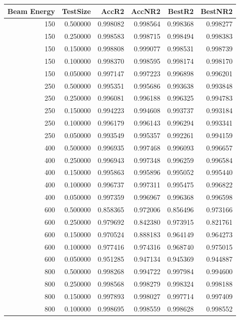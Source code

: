 \begin{tabular}{rrrrrr}
\toprule
Beam Energy & TestSize & AccR2 & AccNR2 & BestR2 & BestNR2 \\
\midrule
150 & 0.500000 & 0.998082 & 0.998564 & 0.998368 & 0.998277 \\
150 & 0.250000 & 0.998583 & 0.998715 & 0.998494 & 0.998383 \\
150 & 0.150000 & 0.998808 & 0.999077 & 0.998531 & 0.998739 \\
150 & 0.100000 & 0.998370 & 0.998595 & 0.998174 & 0.998170 \\
150 & 0.050000 & 0.997147 & 0.997223 & 0.996898 & 0.996201 \\
250 & 0.500000 & 0.995351 & 0.995686 & 0.993638 & 0.993848 \\
250 & 0.250000 & 0.996081 & 0.996188 & 0.996325 & 0.994783 \\
250 & 0.150000 & 0.994223 & 0.994608 & 0.993737 & 0.993184 \\
250 & 0.100000 & 0.996179 & 0.996143 & 0.996294 & 0.993341 \\
250 & 0.050000 & 0.993549 & 0.995357 & 0.992261 & 0.994159 \\
400 & 0.500000 & 0.996935 & 0.997468 & 0.996093 & 0.996657 \\
400 & 0.250000 & 0.996943 & 0.997348 & 0.996259 & 0.996584 \\
400 & 0.150000 & 0.995863 & 0.995896 & 0.995052 & 0.995440 \\
400 & 0.100000 & 0.996737 & 0.997311 & 0.995475 & 0.996822 \\
400 & 0.050000 & 0.997359 & 0.996967 & 0.996368 & 0.996598 \\
600 & 0.500000 & 0.858365 & 0.972006 & 0.856496 & 0.973166 \\
600 & 0.250000 & 0.979692 & 0.842380 & 0.973915 & 0.821761 \\
600 & 0.150000 & 0.970524 & 0.888183 & 0.964149 & 0.964273 \\
600 & 0.100000 & 0.977416 & 0.974316 & 0.968740 & 0.975015 \\
600 & 0.050000 & 0.951285 & 0.947134 & 0.945369 & 0.944887 \\
800 & 0.500000 & 0.998268 & 0.994722 & 0.997984 & 0.994600 \\
800 & 0.250000 & 0.998568 & 0.998279 & 0.998324 & 0.998188 \\
800 & 0.150000 & 0.997893 & 0.998027 & 0.997714 & 0.997409 \\
800 & 0.100000 & 0.998695 & 0.998559 & 0.998628 & 0.998552 \\

\end{tabular}
